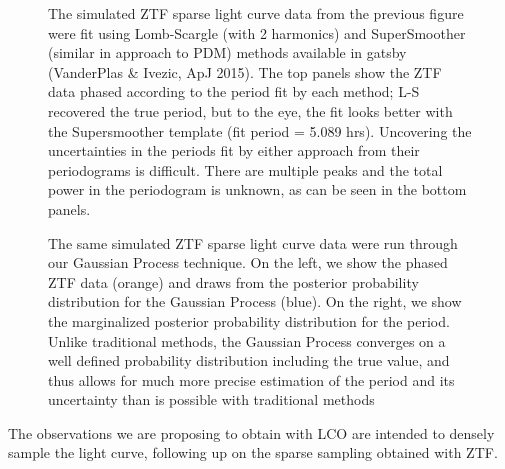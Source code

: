 \documentclass[11pt]{article}
\begin{document}
\begin{figure}[hbt]
\caption{The simulated ZTF sparse light curve data from the previous figure were fit using Lomb-Scargle (with 2 harmonics) and SuperSmoother (similar in approach to PDM) methods available in gatsby (VanderPlas \& Ivezic, ApJ 2015). The top panels show the ZTF data phased according to the period fit by each method; L-S recovered the true period, but to the eye, the 
fit looks better with the Supersmoother template (fit period = 5.089 hrs).
Uncovering the uncertainties in the periods fit by either approach from their periodograms is difficult. There are multiple peaks and the total power in the periodogram is unknown, as can be seen in the bottom panels. 
}
\end{figure}

\begin{figure}[hbt]
\caption{The same simulated ZTF sparse light curve data were run through our Gaussian Process technique. 
On the left, we show the phased ZTF data (orange) and draws from the posterior probability distribution for the Gaussian Process (blue). 
On the right, we show the marginalized posterior probability distribution for the period. Unlike traditional methods, the 
Gaussian Process converges on a well defined probability distribution including the true value, and thus allows for much more 
precise estimation of the period and its uncertainty than is possible with traditional methods
}
\end{figure}

\clearpage


%

%

\expdesign
The observations we are proposing to obtain with LCO are intended to
densely sample the light curve, following up on the sparse sampling
obtained with ZTF.
\end{document}
